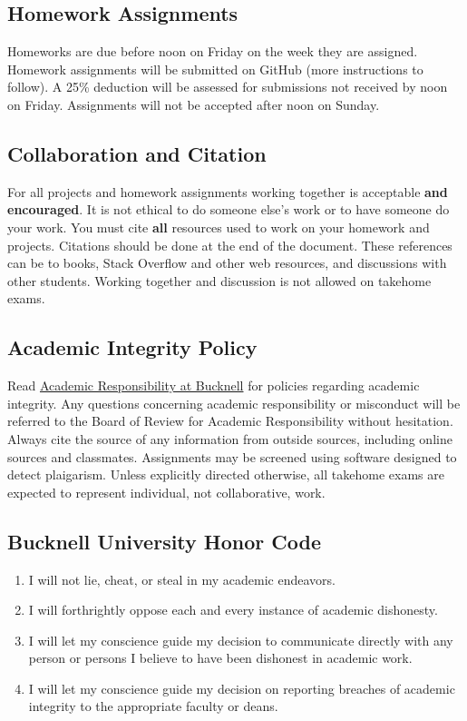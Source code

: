 \documentclass[11pt]{article} %
\begin{document}
  \subsection{Homework Assignments}
  
    Homeworks are due before noon on Friday on the week they are assigned.
    Homework assignments will be submitted on GitHub (more instructions to follow).
    A 25\% deduction will be assessed for submissions not received by noon on Friday. Assignments will not be accepted after noon on Sunday.
  
  \subsection{Collaboration and Citation}
  
    For all projects and homework assignments working together is acceptable \textbf{and encouraged}. 
    It is not ethical to do someone else's work or to have someone do your work. 
    You must cite \textbf{all} resources used to work on your homework and projects. 
    Citations should be done at the end of the document. 
    These references can be to books, Stack Overflow and other web resources, and discussions with other students. 
    Working together and discussion is not allowed on takehome exams.
  
  \subsection{Academic Integrity Policy}
  
    Read \href{"https://www.bucknell.edu/academics/academic-responsibility-support/academic-responsibility"}{Academic Responsibility at Bucknell} for policies regarding academic integrity. Any questions concerning academic responsibility or misconduct will be referred to the Board of Review for Academic Responsibility without hesitation. Always cite the source of any information from outside sources, including online sources and classmates. Assignments may be screened using software designed to detect plaigarism. Unless explicitly directed otherwise, all takehome exams are expected to represent individual, not collaborative, work.
  
  \subsection{Bucknell University Honor Code}
  \begin{enumerate}
  \item I will not lie, cheat, or steal in my academic endeavors.
  \item I will forthrightly oppose each and every instance of academic dishonesty.
  \item I will let my conscience guide my decision to communicate directly with any person or persons I believe to have been dishonest in academic work.
  \item I will let my conscience guide my decision on reporting breaches of academic integrity to the appropriate faculty or deans.
\end{enumerate}
\end{document}

